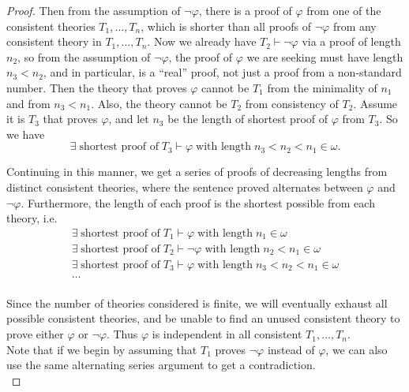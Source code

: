\documentclass{article}
\begin{document}
\begin{enumerate}[label={\bf Q\arabic*:}]
\begin{proof}
      Then from the assumption of $\neg\varphi$, there is a proof of
      $\varphi$ from one of the consistent theories $T_1,\ldots,T_n$, which
      is shorter than all proofs of $\neg\varphi$ from any consistent
      theory in $T_1,\ldots,T_n$. Now we already have
      $T_2\vdash\neg\varphi$ via a proof of length $n_2$, so from the
      assumption of $\neg\varphi$, the proof of $\varphi$ we are seeking
      must have length $n_3<n_2$, and in particular, is a ``real'' proof,
      not just a proof from a non-standard number. Then the theory that
      proves $\varphi$ cannot be $T_1$ from the minimality of $n_1$ and
      from $n_3<n_1$. Also, the theory cannot be $T_2$ from consistency of
      $T_2$. Assume it is $T_3$ that proves $\varphi$, and let $n_3$ be the
      length of shortest proof of $\varphi$ from $T_3$. So we have
      \[\exists\; \text{shortest proof of}\; T_3\vdash\varphi\;
      \text{with length}\; n_3<n_2<n_1\in\omega.\]

      Continuing in this manner, we get a series of proofs of decreasing
      lengths from distinct consistent theories, where the sentence proved
      alternates between $\varphi$ and $\neg\varphi$. Furthermore, the
      length of each proof is the shortest possible from each theory, i.e.
      \[\begin{array}{l}
        \exists\; \text{shortest proof of}\; T_1\vdash\varphi\; \text{with
        length}\; n_1\in\omega\\
        \exists\; \text{shortest proof of}\; T_2\vdash\neg\varphi\;
        \text{with length}\; n_2<n_1\in\omega\\
        \exists\; \text{shortest proof of}\; T_3\vdash\varphi\;
        \text{with length}\; n_3<n_2<n_1\in\omega\\
        \ldots\\
      \end{array}\]

      Since the number of theories considered is finite, we will eventually
      exhaust all possible consistent theories, and be unable to find an
      unused consistent theory to prove either $\varphi$ or $\neg\varphi$.
      Thus $\varphi$ is independent in all consistent $T_1,\ldots,T_n$. \\

      Note that if we begin by assuming that $T_1$ proves $\neg\varphi$
      instead of $\varphi$, we can also use the same alternating series
      argument to get a contradiction. \\


\end{proof}
\end{enumerate}
\end{document}
